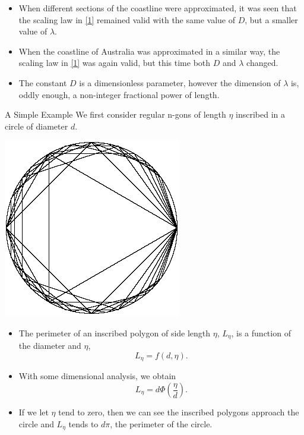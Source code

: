 \documentclass[10pt]{beamer}
\begin{document}
\begin{frame}{}
  \begin{itemize}
  \item
    When different sections of the coastline were approximated, it was seen that the scaling law in \eqref{1} remained valid with the same value of $D$, but a smaller value of $\lambda$.
  \item
    When the coastline of Australia was approximated in a similar way, the scaling law in \eqref{1} was again valid, but this time both $D$ and $\lambda$ changed.
  \item
    The constant $D$ is a dimensionless parameter, however the dimension of $\lambda$ is, oddly enough, a non-integer fractional power of length.
  \end{itemize}
\end{frame}

\begin{frame}{A Simple Example}
  We first consider regular n-gons of length $\eta$ inscribed in a circle of diameter $d$.
  \begin{center}
    \includegraphics[scale=0.5]{./poly.png}
  \end{center}
  
\end{frame}

\begin{frame}{}
  \begin{itemize}
  \item
    The perimeter of an inscribed polygon of side length $\eta$, $L_{\eta}$, is a function of the diameter and $\eta$, $$L_{\eta} = f(d,\eta).$$
  \item
    With some dimensional analysis, we obtain $$L_{\eta} = d\Phi\left(\frac{\eta}{d}\right).$$
  \item
    If we let $\eta$ tend to zero, then we can see the inscribed polygons approach the circle and $L_{\eta}$ tends to $d\pi$, the perimeter of the circle.
  \end{itemize}
\end{frame}
\end{document}
